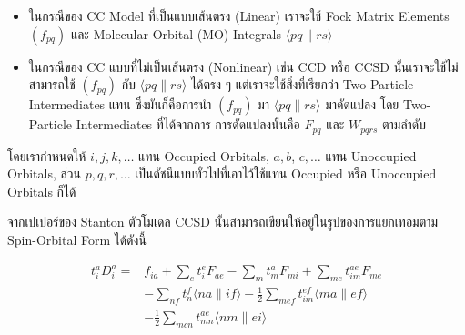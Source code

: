 \begin{itemize}[topsep=0pt,noitemsep]
  \setlength\itemsep{1em}
  \item ในกรณีของ CC Model ที่เป็นแบบเส้นตรง (Linear) เราจะใช้ Fock Matrix Elements
        $\left(f_{p q}\right)$ และ Molecular Orbital (MO) Integrals $\langle p q \| r s\rangle$

  \item ในกรณีของ CC แบบที่ไม่เป็นเส้นตรง (Nonlinear) เช่น CCD หรือ CCSD นั้นเราจะใช้ไม่สามารถใช้ $\left(f_{p q}\right)$
        กับ $\langle p q \| r s\rangle$ ได้ตรง ๆ แต่เราจะใช้สิ่งที่เรียกว่า Two-Particle Intermediates แทน ซึ่งมันก็คือการนำ
        $\left(f_{p q}\right)$ มา $\langle p q \| r s\rangle$ มาดัดแปลง โดย Two-Particle Intermediates ที่ได้จากการ%
        การดัดแปลงนั้นคือ $F_{p q}$ และ $W_{p q r s}$ ตามลำดับ
\end{itemize}

\noindent โดยเรากำหนดให้ $i, j, k, \ldots$ แทน Occupied Orbitals, $a, b$, $c, \ldots$ แทน Unoccupied Orbitals,
ส่วน $p, q, r, \ldots$ เป็นดัชนีแบบทั่วไปที่เอาไว้ใช้แทน Occupied หรือ Unoccupied Orbitals ก็ได้

จากเปเปอร์ของ Stanton ตัวโมเดล CCSD นั้นสามารถเขียนให้อยู่ในรูปของการแยกเทอมตาม Spin-Orbital Form ได้ดังนี้

\noindent {}

\begin{equation}
  \label{eq:singles_cluster_operator}
  \begin{aligned}
    t_i^a D_i^a
    =
     & f_{i a} + \sum_e t_i^e F_{a e} - \sum_m t_m^a F_{m i}
    + \sum_{m e} t_{i m}^{a e} F_{m e}                                                                               \\
     & - \sum_{n f} t_n^f\langle n a \| i f\rangle - \frac{1}{2} \sum_{m e f} t_{i m}^{e f}\langle m a \| e f\rangle \\
     & - \frac{1}{2} \sum_{m c n} t_{m n}^{a e}\langle n m \| e i\rangle
  \end{aligned}
\end{equation}

\noindent {}

